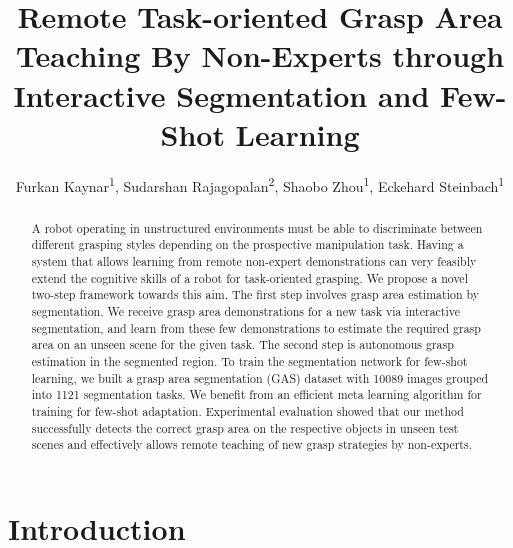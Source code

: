 \documentclass[letterpaper]{article} %
\title{Remote Task-oriented Grasp Area Teaching By Non-Experts through Interactive Segmentation and Few-Shot Learning}
\author {Furkan Kaynar\textsuperscript{\rm 1}\equalcontrib, Sudarshan Rajagopalan\textsuperscript{\rm 2}\equalcontrib,
Shaobo Zhou\textsuperscript{\rm 1},
Eckehard Steinbach\textsuperscript{\rm 1}}
\begin{document}
\maketitle
\begin{abstract}

A robot operating in unstructured environments must be able to discriminate between different grasping styles depending on the prospective manipulation task. Having a system that allows learning from remote non-expert demonstrations can very feasibly extend the cognitive skills of a robot for task-oriented grasping. We propose a novel two-step framework towards this aim. The first step involves grasp area estimation by segmentation. We receive grasp area demonstrations for a new task via interactive segmentation, and learn from these few demonstrations to estimate the required grasp area on an unseen scene for the given task. The second step is autonomous grasp estimation in the segmented region. To train the segmentation network for few-shot learning, we built a grasp area segmentation (GAS) dataset with 10089 images grouped into 1121 segmentation tasks. We benefit from an efficient meta learning algorithm for training for few-shot adaptation. Experimental evaluation showed that our method successfully detects the correct grasp area on the respective objects in unseen test scenes and effectively allows remote teaching of new grasp strategies by non-experts.

\end{abstract}

\section{Introduction}
\label{sec:intro}
\end{document}
